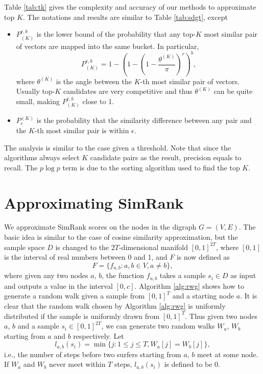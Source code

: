 \documentclass{article}
\begin{document}
Table \ref{tab:tk} gives the complexity and accuracy of our methods to approximate top $K$. The notations and results are similar to Table \ref{tab:sdgt}, except
\begin{itemize}
\item $P_{(K)}^{r,b}$ is the lower bound of the probability that any top-$K$ most similar pair of vectors are mapped into the same bucket. 
In particular,
$$P_{(K)}^{r,b} = 1 - \left(1-\left(1-\frac{\theta^{(K)}}{\pi}\right)^r\right)^b,$$ 
where $\theta^{(K)}$ is the angle between the $K$-th most similar pair of vectors. Usually top-$K$ candidates are very competitive and thus $\theta^{(K)}$ can be quite small, making $P_{(K)}^{r,b}$ close to 1.
\item $P_\epsilon^{(K)}$ is the probability that the similarity difference between any pair and the $K$-th most similar pair is within $\epsilon$.
\end{itemize}
The analysis is similar to the case given a threshold. Note that since the algorithms always select $K$ candidate pairs as the result, precision equals to recall. The $p \log p$ term is due to the sorting algorithm used to find the top $K$.

\section{Approximating SimRank}
\label{sec:asr}
We approximate SimRank scores on the nodes in the digraph $G=(V,E)$. 
The basic idea is similar to the case of cosine similarity approximation, but the sample space $D$ is changed to the $2T$-dimensional manifold $[0,1]^{2T}$, where $[0,1]$ is the interval of real numbers between 0 and 1, and $F$ is now defined as
$$F = \{f_{a,b} : a,b\in V, a\not= b\},$$
where given any two nodes $a$, $b$, the function $f_{a,b}$ takes a sample $s_i\in D$ as input and outputs a value in the interval $[0,c]$. Algorithm \ref{alg:rwg} shows how to generate a random walk given a sample from $[0,1]^T$ and a starting node $a$. It is clear that the random walk chosen by Algorithm \ref{alg:rwg} is uniformly distributed if the sample is uniformly drawn from $[0,1]^T$. Thus given two nodes $a$, $b$ and a sample $s_i \in [0,1]^{2T}$, we can generate two random walks $W_a$, $W_b$ starting from $a$ and $b$ respectively. Let 
$$l_{a,b}(s_i) = \min\{j: 1\leq j\leq T, W_a[j] = W_b[j]\},$$
i.e., the number of steps before two surfers starting from $a$, $b$ meet at some node. If $W_a$ and $W_b$ never meet within $T$ steps, $l_{a,b}(s_i)$ is defined to be 0.
\end{document}
